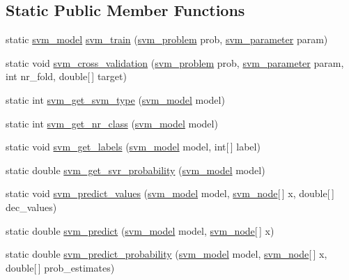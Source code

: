 \subsection*{Static Public Member Functions}
\begin{DoxyCompactItemize}
\item 
static \hyperlink{classlibsvm_1_1svm__model}{svm\_\-model} \hyperlink{classlibsvm_1_1svm_a004fbb315b52331b29bb808f4e8dc5f6}{svm\_\-train} (\hyperlink{classlibsvm_1_1svm__problem}{svm\_\-problem} prob, \hyperlink{classlibsvm_1_1svm__parameter}{svm\_\-parameter} param)
\item 
static void \hyperlink{classlibsvm_1_1svm_a4f11227fa986302b335f5b66ff757d14}{svm\_\-cross\_\-validation} (\hyperlink{classlibsvm_1_1svm__problem}{svm\_\-problem} prob, \hyperlink{classlibsvm_1_1svm__parameter}{svm\_\-parameter} param, int nr\_\-fold, double\mbox{[}$\,$\mbox{]} target)
\item 
static int \hyperlink{classlibsvm_1_1svm_ace8ea715955f48726ead1f0f51afef7d}{svm\_\-get\_\-svm\_\-type} (\hyperlink{classlibsvm_1_1svm__model}{svm\_\-model} model)
\item 
static int \hyperlink{classlibsvm_1_1svm_a7a0dc6c66db65ac709a632f20dd50380}{svm\_\-get\_\-nr\_\-class} (\hyperlink{classlibsvm_1_1svm__model}{svm\_\-model} model)
\item 
static void \hyperlink{classlibsvm_1_1svm_a3746bd2011ab0a72b2d4c4db942a5e73}{svm\_\-get\_\-labels} (\hyperlink{classlibsvm_1_1svm__model}{svm\_\-model} model, int\mbox{[}$\,$\mbox{]} label)
\item 
static double \hyperlink{classlibsvm_1_1svm_a3e758cf127a712b376423ef402f8f1ee}{svm\_\-get\_\-svr\_\-probability} (\hyperlink{classlibsvm_1_1svm__model}{svm\_\-model} model)
\item 
static void \hyperlink{classlibsvm_1_1svm_abb85911e9d78059beba225553498afc5}{svm\_\-predict\_\-values} (\hyperlink{classlibsvm_1_1svm__model}{svm\_\-model} model, \hyperlink{classlibsvm_1_1svm__node}{svm\_\-node}\mbox{[}$\,$\mbox{]} x, double\mbox{[}$\,$\mbox{]} dec\_\-values)
\item 
static double \hyperlink{classlibsvm_1_1svm_ac4e700b829a54dd7288e6941d7ade418}{svm\_\-predict} (\hyperlink{classlibsvm_1_1svm__model}{svm\_\-model} model, \hyperlink{classlibsvm_1_1svm__node}{svm\_\-node}\mbox{[}$\,$\mbox{]} x)
\item 
static double \hyperlink{classlibsvm_1_1svm_a50d9c958840931560989a657514da889}{svm\_\-predict\_\-probability} (\hyperlink{classlibsvm_1_1svm__model}{svm\_\-model} model, \hyperlink{classlibsvm_1_1svm__node}{svm\_\-node}\mbox{[}$\,$\mbox{]} x, double\mbox{[}$\,$\mbox{]} prob\_\-estimates)

\end{DoxyCompactItemize}
